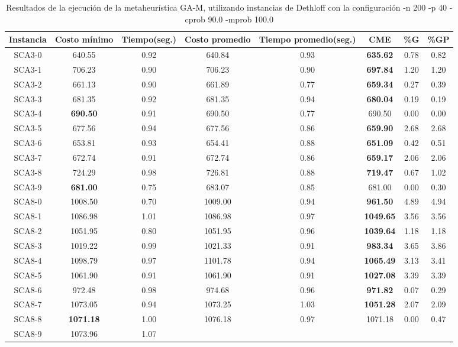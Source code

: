 \begin{table}[ht]
\caption{Resultados de la ejecución de la metaheurística GA-M, utilizando instancias de Dethloff con la configuración -n 200 -p 40 -cprob 90.0 -mprob 100.0}
\centering
\small
\begin{tabular}{c c c c c c c c}
\hline\hline
Instancia & Costo mínimo & Tiempo(seg.) & Costo promedio & Tiempo promedio(seg.) & CME & \%G & \%GP \\ [0.5ex]
\hline
SCA3-0 & 640.55 & 0.92 & 
640.84 & 0.93 & \bf{635.62} & 
0.78 & 0.82\\SCA3-1 & 706.23 & 0.90 & 
706.23 & 0.90 & \bf{697.84} & 
1.20 & 1.20\\SCA3-2 & 661.13 & 0.90 & 
661.89 & 0.77 & \bf{659.34} & 
0.27 & 0.39\\SCA3-3 & 681.35 & 0.92 & 
681.35 & 0.94 & \bf{680.04} & 
0.19 & 0.19\\SCA3-4 & \bf{690.50} & 0.91 & 
690.50 & 0.77 & 690.50 & 0.00
 & 0.00\\
SCA3-5 & 677.56 & 0.94 & 
677.56 & 0.86 & \bf{659.90} & 
2.68 & 2.68\\SCA3-6 & 653.81 & 0.93 & 
654.41 & 0.88 & \bf{651.09} & 
0.42 & 0.51\\SCA3-7 & 672.74 & 0.91 & 
672.74 & 0.86 & \bf{659.17} & 
2.06 & 2.06\\SCA3-8 & 724.29 & 0.98 & 
726.81 & 0.88 & \bf{719.47} & 
0.67 & 1.02\\SCA3-9 & \bf{681.00} & 0.75 & 
683.07 & 0.85 & 681.00 & 0.00
 & 0.30\\SCA8-0 & 1008.50 & 0.70 & 
1009.00 & 0.94 & \bf{961.50} & 
4.89 & 4.94\\SCA8-1 & 1086.98 & 1.01 & 
1086.98 & 0.97 & \bf{1049.65} & 
3.56 & 3.56\\SCA8-2 & 1051.95 & 0.80 & 
1051.95 & 0.96 & \bf{1039.64} & 
1.18 & 1.18\\SCA8-3 & 1019.22 & 0.99 & 
1021.33 & 0.91 & \bf{983.34} & 
3.65 & 3.86\\SCA8-4 & 1098.79 & 0.97 & 
1101.78 & 0.94 & \bf{1065.49} & 
3.13 & 3.41\\SCA8-5 & 1061.90 & 0.91 & 
1061.90 & 0.91 & \bf{1027.08} & 
3.39 & 3.39\\SCA8-6 & 972.48 & 0.98 & 
974.68 & 0.96 & \bf{971.82} & 
0.07 & 0.29\\SCA8-7 & 1073.05 & 0.94 & 
1073.25 & 1.03 & \bf{1051.28} & 
2.07 & 2.09\\SCA8-8 & \bf{1071.18} & 1.00 & 
1076.18 & 0.97 & 1071.18 & 0.00
 & 0.47\\SCA8-9 & 1073.96 & 1.07 & 

\end{tabular}
\end{table}
